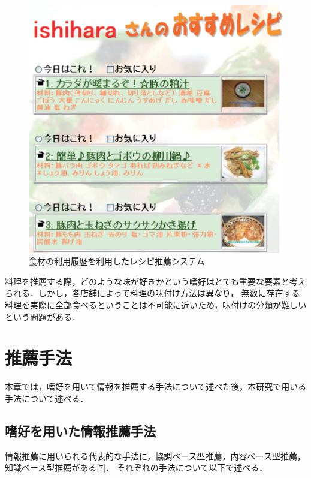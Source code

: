 \documentclass{funthesis}
\begin{document}
\begin{figure}[!b]
  \begin{center}
    \includegraphics[clip,width=13cm]{resipi.eps}
    \caption{食材の利用履歴を利用したレシピ推薦システム\cite{6}}
  \end{center}
\end{figure}

料理を推薦する際，どのような味が好きかという嗜好はとても重要な要素と考えられる．しかし，各店舗によって料理の味付け方法は異なり，
無数に存在する料理を実際に全部食べるということは不可能に近いため，味付けの分類が難しいという問題がある．


\chapter{推薦手法}
本章では，嗜好を用いて情報を推薦する手法について述べた後，本研究で用いる手法について述べる．

\section{嗜好を用いた情報推薦手法}
情報推薦に用いられる代表的な手法に，協調ベース型推薦，内容ベース型推薦，知識ベース型推薦がある[7]．
それぞれの手法について以下で述べる．
\end{document}
